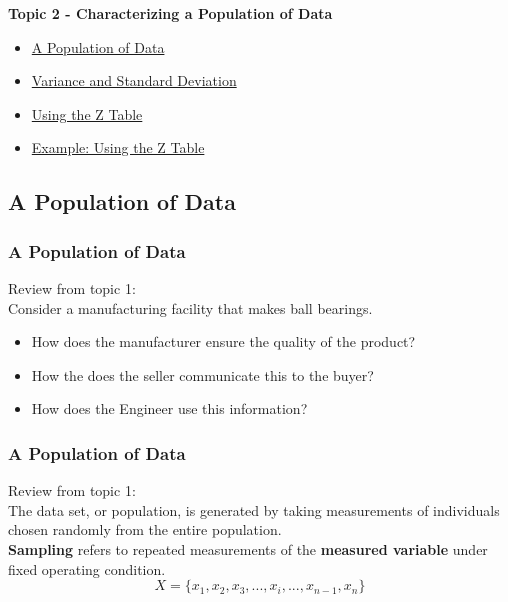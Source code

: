 \documentclass[fleqn]{beamer} %
\newcommand{\sectionIItitle}{Characterizing a Population of Data}
\newcommand{\sectionIIsubsectionItitle}{A Population of Data}
\newcommand{\sectionIIsubsectionIItitle}{Variance and Standard Deviation}
\newcommand{\sectionIIsubsectionIIItitle}{Using the Z Table}
\newcommand{\sectionIIsubsectionIVtitle}{Example: Using the Z Table}
\begin{document}
		\begin{frame}
			\large \textbf{Topic 2 - \sectionIItitle} \vspace{3mm}\\

			\begin{itemize}
				\item \hyperlink{sectionIIsubsectionI}{\sectionIIsubsectionItitle} \vspc %
				\item \hyperlink{sectionIIsubsectionII}{\sectionIIsubsectionIItitle} \vspc %
				\item \hyperlink{sectionIIsubsectionIII}{\sectionIIsubsectionIIItitle} \vspc %
				\item \hyperlink{sectionIIsubsectionIV}{\sectionIIsubsectionIVtitle} \vspc %
			\end{itemize}

		\end{frame}

		\subsection{\sectionIIsubsectionItitle}\label{sectionIIsubsectionI}

			\begin{frame}[label=sectionIIsubsectionI]
				\frametitle{\sectionIIsubsectionItitle}

        Review from topic 1:\vspace{2mm}\\
				
        Consider a manufacturing facility that makes ball bearings. 
				\begin{itemize}		
					\item How does the manufacturer ensure the quality of the product?
					\item How the does the seller communicate this to the buyer?
					\item How does the Engineer use this information? 
				\end{itemize}

			\end{frame}

			\begin{frame}[label=sectionIIsubsectionI]
				\frametitle{\sectionIIsubsectionItitle}
        Review from topic 1:\vspace{2mm}\\
				
The data set, or population, is generated by taking measurements of individuals chosen randomly from the entire population. \\ 
		 
				 {\bf \RD Sampling} refers to repeated measurements of the {\bf \PR measured variable} under fixed operating condition.	\\
				 
				 \[ X = \{ x_1,x_2,x_3, ... , x_i , ... , x_{n-1}, x_{n} \}  \]
			\end{frame}
		
\end{document}
